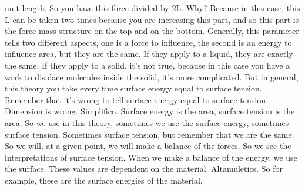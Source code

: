 unit length. So you have this force divided by 2L. Why? Because in this case, this L can be taken two times because you are increasing this part, and so this part is the force mass structure on the top and on the bottom. Generally, this parameter tells two different aspects, one is a force to influence, the second is an energy to influence area, but they are the same. If they apply to a liquid, they are exactly the same. If they apply to a solid, it's not true, because in this case you have a work to displace molecules inside the solid, it's more complicated. But in general, this theory you take every time surface energy equal to surface tension. Remember that it's wrong to tell surface energy equal to surface tension. Dimension is wrong. Simplifico. Surface energy is the area, surface tension is the area. So we use in this theory, sometimes we use the surface energy, sometimes surface tension. Sometimes surface tension, but remember that we are the same. So we will, at a given point, we will make a balance of the forces. So we see the interpretations of surface tension. When we make a balance of the energy, we use the surface. These values are dependent on the material. Altamuletics. So for example, these are the surface energies of the material.
